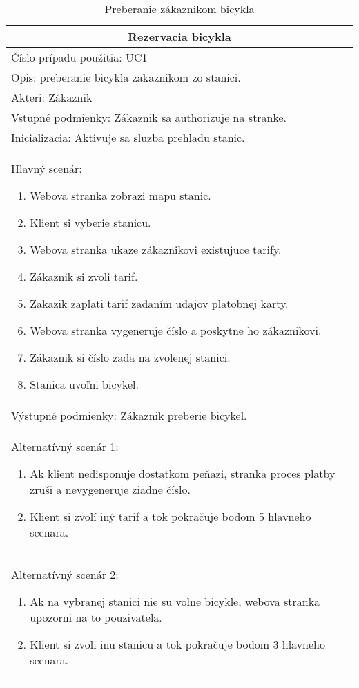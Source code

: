 \begin{table}[h]
  \centering
  \begin{tabular}{|p{12cm}|}
   \hline
   \multicolumn{1}{|c|}{ \textbf{Rezervacia bicykla}} \\
   \hline
   Číslo prípadu použitia: UC1\\
   \hline
   Opis: preberanie bicykla zakaznikom zo stanici.\\
   \hline
   Akteri: Zákaznik\\
   \hline
   Vstupné podmienky: Zákaznik sa authorizuje na stranke.\\
   \hline
   Inicializacia: Aktivuje sa sluzba prehladu stanic.\\
   \hline
   Hlavný scenár:
   \begin{enumerate} 
       \item Webova stranka zobrazi mapu stanic.
       \item Klient si vyberie stanicu.
       \item Webova stranka ukaze zákaznikovi existujuce tarify.
       \item Zákaznik si zvoli tarif. 
       \item Zakazik zaplati tarif zadaním udajov platobnej karty.
       \item Webova stranka vygeneruje číslo a poskytne ho zákaznikovi.
       \item Zákaznik si číslo zada na zvolenej stanici.
       \item Stanica uvoľni bicykel.
   \end{enumerate}\\
   \hline
   Výstupné podmienky: Zákaznik preberie bicykel.\\
   \hline
   Alternatívný scenár 1:
   \begin{enumerate} 
       \item Ak klient nedisponuje dostatkom peňazi, stranka proces
             platby zruši a nevygeneruje ziadne číslo. 
       \item Klient si zvolí iný tarif a tok pokračuje bodom 5 hlavneho scenara.
   \end{enumerate}\\
   \hline
   Alternatívný scenár 2:
   \begin{enumerate} 
       \item Ak na vybranej stanici nie su volne bicykle, webova stranka 
             upozorni na to pouzivatela. 
       \item Klient si zvoli inu stanicu a tok pokračuje bodom 3 hlavneho scenara.
   \end{enumerate}\\
   \hline
  \end{tabular}
  \caption{Preberanie zákaznikom bicykla}
  \label{tab:use_case_steps}
\end{table}
